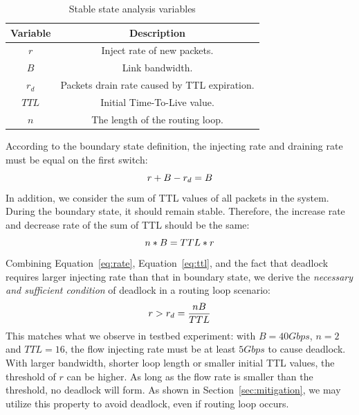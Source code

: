 \begin{table}[h]
\centering
\vspace{-0.1in}
\caption{\small Stable state analysis variables}
\vspace{-0.15in}
\label{tab:stable_state}
{\small
\begin{tabular}{|c|c|}
 \hline
Variable &  Description \\
\hline
$r$ & Inject rate of new packets. \\
\hline
$B$ & Link bandwidth. \\
\hline
$r_d$ & Packets drain rate caused by TTL expiration. \\
\hline
$TTL$ & Initial Time-To-Live value. \\
\hline
$n$ & The length of the routing loop. \\
\hline
\end{tabular}
}
\vspace{-0.15in}
\end{table}

According to the boundary state definition, the injecting rate and draining rate
must be equal on the first switch:
\begin{equation}
\small
r + B - r_d = B
\label{eq:rate}
\end{equation}
In addition, we consider the sum of TTL values of all packets in the system. 
During the boundary state, it should remain stable. Therefore, the increase
rate and decrease rate of the sum of TTL should be the same:
\begin{equation}
\small
n * B = TTL * r
\label{eq:ttl}
\end{equation}
Combining Equation~\ref{eq:rate}, Equation~\ref{eq:ttl}, and the fact that
deadlock requires larger injecting rate than that in boundary state, we derive the 
{\em necessary and sufficient condition} of deadlock in a routing loop scenario:
\begin{equation}
\small
r > r_d = \frac{nB}{TTL}
\label{eq:condition}
\end{equation}
This matches what we observe in testbed experiment: with $B=40Gbps$, $n=2$ and
$TTL=16$, the flow injecting rate must be at least $5Gbps$ to cause deadlock. With larger bandwidth,
shorter loop length or smaller initial TTL values, the threshold of $r$ can be higher.
As long as the flow rate is smaller than the threshold, no deadlock will form.
As shown in Section~\ref{sec:mitigation}, we may utilize this property to avoid deadlock, 
even if routing loop occurs. 

\secspace
